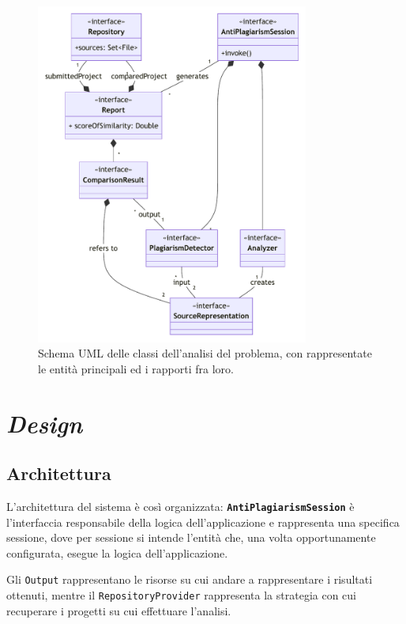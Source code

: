 \begin{figure}[h!]
    \centering
    \includegraphics[width=0.8\textwidth]{resources/img/02-domain.pdf}
    \caption{Schema UML delle classi dell'analisi del problema, con rappresentate le entità principali ed i rapporti fra loro.}
    \label{img:02-domain}
\end{figure}

\section{\textit{Design}}

\subsection{Architettura}
%
%
L'architettura del sistema è così organizzata: \textbf{\texttt{AntiPlagiarismSession}} è l'interfaccia responsabile della logica dell'applicazione e rappresenta una specifica sessione, dove per sessione si intende l'entità che, una volta opportunamente configurata, esegue la logica dell'applicazione.

Gli \texttt{Output} rappresentano le risorse su cui andare a rappresentare i risultati ottenuti, mentre il \texttt{RepositoryProvider} rappresenta la strategia con cui recuperare i progetti su cui effettuare l'analisi.

